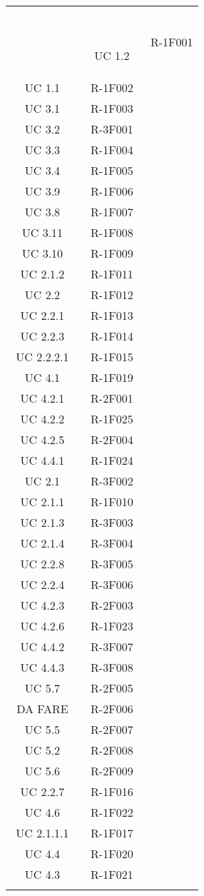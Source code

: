 \begin{tabularx}{\textwidth}{c|c}
	
	\rowcolor{greySWEight}
	\textcolor{white}{\textbf{Caso d'uso}} &
	\textcolor{white}{\textbf{Requisito}}\endhead

 	UC 1.2 & R-1F001\\
	UC 1.1 & R-1F002\\
	UC 3.1 & R-1F003\\
	UC 3.2 & R-3F001\\
	UC 3.3 & R-1F004\\
	UC 3.4 & R-1F005\\
	UC 3.9 & R-1F006\\
	UC 3.8 & R-1F007\\
	UC 3.11 & R-1F008\\
	UC 3.10 & R-1F009\\
	UC 2.1.2 & R-1F011\\
	UC 2.2 & R-1F012\\
	UC 2.2.1 & R-1F013\\
	UC 2.2.3 & R-1F014\\
	UC 2.2.2.1 & R-1F015\\
	UC 4.1 & R-1F019\\
	UC 4.2.1 & R-2F001\\
	UC 4.2.2 & R-1F025\\
	UC 4.2.5 & R-2F004\\
	UC 4.4.1 & R-1F024\\
	UC 2.1 & R-3F002\\
	UC 2.1.1 & R-1F010\\
	UC 2.1.3 & R-3F003\\
	UC 2.1.4 & R-3F004\\
	UC 2.2.8 & R-3F005\\
	UC 2.2.4 & R-3F006\\
	UC 4.2.3 & R-2F003\\
	UC 4.2.6 & R-1F023\\
	UC 4.4.2 & R-3F007\\
	UC 4.4.3 & R-3F008\\
	UC 5.7 & R-2F005\\
	DA FARE & R-2F006\\
	UC 5.5 & R-2F007\\
	UC 5.2 & R-2F008\\
	UC 5.6 & R-2F009\\
	UC 2.2.7 & R-1F016\\
	UC 4.6   & R-1F022\\
	UC 2.1.1.1 & R-1F017\\
	UC 4.4   & R-1F020\\
	UC 4.3     & R-1F021\\
	
	\caption{Tabella tracciamento casi d'uso-requisiti} \label{tab:tabellafonterequisiti}
\end{tabularx}
